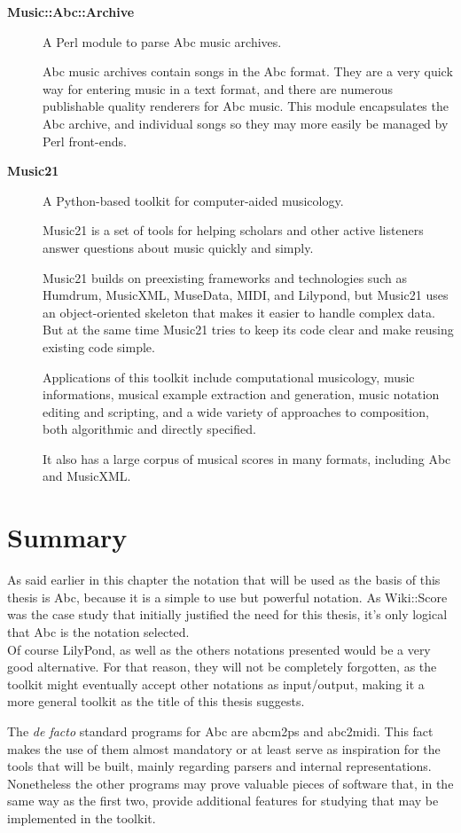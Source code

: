 \documentclass[main.tex]{files}
\begin{document}
\begin{description}
  \item[\textbf{Music::Abc::Archive}]\cite{music_abc_archive:Online}
    A Perl module to parse Abc music archives.
    
    Abc music archives contain songs in the Abc format. They are a very quick way for entering
    music in a text format, and there are numerous publishable quality renderers for Abc
    music. This module encapsulates the Abc archive, and individual songs so they may more
    easily be managed by Perl front-ends.

  \item[\textbf{Music21}]\cite{Music21:Online}
    A Python-based toolkit for computer-aided musicology.
    
    Music21 is a set of tools for helping scholars and other active listeners answer questions
    about music quickly and simply.

    Music21 builds on preexisting frameworks and technologies such as Humdrum, MusicXML,
    MuseData, MIDI, and Lilypond, but Music21 uses an object-oriented skeleton that makes it
    easier to handle complex data. But at the same time Music21 tries to keep its code clear
    and make reusing existing code simple.

    Applications of this toolkit include computational musicology, music informations, musical
    example extraction and generation, music notation editing and scripting, and a wide variety
    of approaches to composition, both algorithmic and directly specified.

    It also has a large corpus of musical scores in many formats, including Abc and MusicXML.
\end{description}

\section{Summary}

As said earlier in this chapter the notation that will be used as the basis of this thesis is Abc,
because it is a simple to use but powerful notation. As Wiki::Score was the case study that initially
justified the need for this thesis, it's only logical that Abc is the notation selected.\\
Of course LilyPond, as well as the others notations presented would be a very good alternative. For
that reason, they will not be completely forgotten, as the toolkit might eventually accept other
notations as input/output, making it a more general toolkit as the title of this thesis suggests.

The \textit{de facto} standard programs for Abc are abcm2ps and abc2midi. This fact makes the use of
them almost mandatory or at least serve as inspiration for the tools that will be built, mainly
regarding parsers and internal representations.\\
Nonetheless the other programs may prove valuable pieces of software that, in the same way as the
first two, provide additional features for studying that may be implemented in the toolkit.
\end{document}
